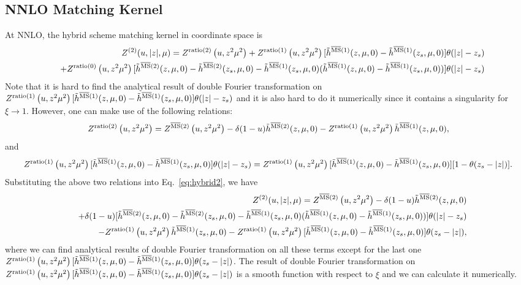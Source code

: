 \documentclass[prd,aps,twocolumn,preprintnumbers, showpacs, nofootinbib,superscriptaddress,notitlepage]{revtex4-2}
\def\bea{\begin{eqnarray}}
\def\eea{\end{eqnarray}}
\begin{document}
\subsection{NNLO Matching Kernel}
At NNLO, the hybrid scheme matching kernel in coordinate space is
\bea\label{eq:hybrid2}
&&Z^{(2)}(u,|z|,\mu)=Z^{\rm ratio(2)}\left(u,z^{2} \mu^{2}\right)+Z^{\rm ratio(1)}\left(u,z^{2} \mu^{2}\right)[\tilde{h}^{\overline{\rm MS}(1)}(z, \mu, 0)-\tilde{h}^{\overline{\rm MS}(1)}(z_s, \mu, 0)]\theta(|z|-z_s) \nonumber\\ 
&&+ Z^{\rm ratio(0)}\left(u,z^{2} \mu^{2}\right)[\tilde{h}^{\overline{\rm MS}(2)}(z, \mu, 0)-\tilde{h}^{\overline{\rm MS}(2)}(z_s, \mu, 0)-\tilde{h}^{\overline{\rm MS}(1)}(z_s, \mu, 0)(\tilde{h}^{\overline{\rm MS}(1)}(z, \mu, 0)-\tilde{h}^{\overline{\rm MS}(1)}(z_s, \mu, 0))]\theta(|z|-z_s) \nonumber\\ 
\eea
Note that it is hard to find the analytical result of double Fourier transformation on $Z^{\rm ratio(1)}\left(u,z^{2} \mu^{2}\right)[\tilde{h}^{\overline{\rm MS}(1)}(z, \mu, 0)-\tilde{h}^{\overline{\rm MS}(1)}(z_s, \mu, 0)]\theta(|z|-z_s)$ and it is also hard to do it numerically since it contains a singularity for $\xi \rightarrow 1$. However, one can make use of the following relations:
$$
Z^{\rm ratio(2)}\left(u,z^{2} \mu^{2}\right)=Z^{\overline{\rm MS}(2)}\left(u,z^{2} \mu^{2}\right)-\delta(1-u)\tilde{h}^{\overline{\rm MS}(2)}(z, \mu, 0)-Z^{\rm ratio(1)}\left(u,z^{2} \mu^{2}\right)\tilde{h}^{\overline{\rm MS}(1)}(z, \mu, 0),
$$
and
$$
Z^{\rm ratio(1)}\left(u,z^{2} \mu^{2}\right)[\tilde{h}^{\overline{\rm MS}(1)}(z, \mu, 0)-\tilde{h}^{\overline{\rm MS}(1)}(z_s, \mu, 0)]\theta(|z|-z_s)=Z^{\rm ratio(1)}\left(u,z^{2} \mu^{2}\right)[\tilde{h}^{\overline{\rm MS}(1)}(z, \mu, 0)-\tilde{h}^{\overline{\rm MS}(1)}(z_s, \mu, 0)][1-\theta(z_s-|z|)].
$$
Substituting the above two relations into Eq.~\eqref{eq:hybrid2}, we have
\bea\label{eq:hybrid2new}
&&Z^{(2)}(u,|z|,\mu)=Z^{\overline{\rm MS}(2)}\left(u,z^{2} \mu^{2}\right)-\delta(1-u)\tilde{h}^{\overline{\rm MS}(2)}(z, \mu, 0) \nonumber\\ 
&&+ \delta(1-u)[\tilde{h}^{\overline{\rm MS}(2)}(z, \mu, 0)-\tilde{h}^{\overline{\rm MS}(2)}(z_s, \mu, 0)-\tilde{h}^{\overline{\rm MS}(1)}(z_s, \mu, 0)(\tilde{h}^{\overline{\rm MS}(1)}(z, \mu, 0)-\tilde{h}^{\overline{\rm MS}(1)}(z_s, \mu, 0))]\theta(|z|-z_s)\nonumber\\ 
&&-Z^{\rm ratio(1)}\left(u,z^{2} \mu^{2}\right)\tilde{h}^{\overline{\rm MS}(1)}(z_s, \mu, 0)-Z^{\rm ratio(1)}\left(u,z^{2} \mu^{2}\right)[\tilde{h}^{\overline{\rm MS}(1)}(z, \mu, 0)-\tilde{h}^{\overline{\rm MS}(1)}(z_s, \mu, 0)]\theta(z_s-|z|),
\eea
where we can find analytical results of double Fourier transformation on all these terms except for the last one $Z^{\rm ratio(1)}\left(u,z^{2} \mu^{2}\right)[\tilde{h}^{\overline{\rm MS}(1)}(z, \mu, 0)-\tilde{h}^{\overline{\rm MS}(1)}(z_s, \mu, 0)]\theta(z_s-|z|)$. The result of double Fourier transformation on $Z^{\rm ratio(1)}\left(u,z^{2} \mu^{2}\right)[\tilde{h}^{\overline{\rm MS}(1)}(z, \mu, 0)-\tilde{h}^{\overline{\rm MS}(1)}(z_s, \mu, 0)]\theta(z_s-|z|)$ is a smooth function with respect to $\xi$ and we can calculate it numerically. 
\end{document}
